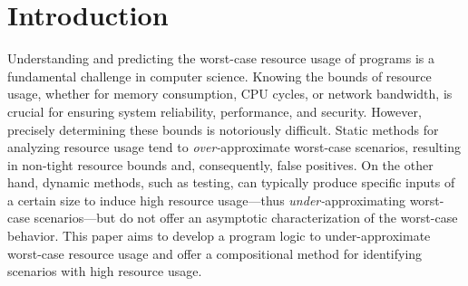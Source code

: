 \section{Introduction}
\label{sec:intro}


%
%
%

Understanding and predicting the worst-case resource usage of programs is a fundamental challenge in computer science.
%
Knowing the bounds of resource usage, whether for memory consumption, CPU cycles, or network bandwidth, is crucial for ensuring system reliability, performance, and security.
%
However, precisely determining these bounds is notoriously difficult.
%
Static methods for analyzing resource usage tend to \emph{over-}approximate worst-case scenarios, resulting in non-tight resource bounds and, consequently, false positives.
%
On the other hand, dynamic methods, such as testing, can typically produce specific inputs of a certain size to induce high resource usage---thus \emph{under-}approximating worst-case scenarios---but do not offer an asymptotic characterization of the worst-case behavior.
%
This paper aims to develop a program logic to under-approximate worst-case resource usage and offer a compositional method for identifying scenarios with high resource usage.

